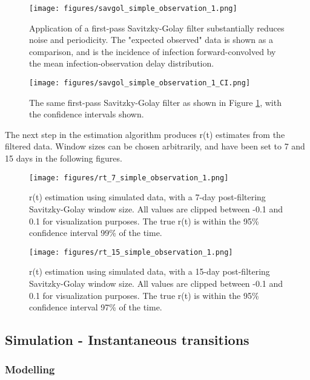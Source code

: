 \documentclass{article}
\begin{document}
{\begin{figure}[h!]
\centering
\texttt{[image: figures/savgol\_simple\_observation\_1.png]}
\caption{Application of a first-pass Savitzky-Golay filter substantially reduces noise and periodicity. The "expected observed" data is shown as a comparison, and is the incidence of infection forward-convolved by the mean infection-observation delay distribution.}
\label{SGnoCI}
\end{figure}

\begin{figure}[h!]
\centering
\texttt{[image: figures/savgol\_simple\_observation\_1\_CI.png]}
\caption{The same first-pass Savitzky-Golay filter as shown in Figure \ref{SGnoCI}, with the confidence intervals shown.} 

\end{figure}

The next step in the estimation algorithm produces r(t) estimates from the filtered data. Window sizes can be chosen arbitrarily, and have been set to 7 and 15 days in the following figures.


\begin{figure}[h!]
\centering
\texttt{[image: figures/rt\_7\_simple\_observation\_1.png]}
\caption{r(t) estimation using simulated data, with a 7-day post-filtering Savitzky-Golay window size. All values are clipped between -0.1 and 0.1 for visualization purposes. The true r(t) is within the 95\% confidence interval 99\% of the time.}
\end{figure}

\clearpage
\begin{figure}[h!]
\centering
\texttt{[image: figures/rt\_15\_simple\_observation\_1.png]}
\caption{r(t) estimation using simulated data, with a 15-day post-filtering Savitzky-Golay window size. All values are clipped between -0.1 and 0.1 for visualization purposes. The true r(t) is within the 95\% confidence interval 97\% of the time.}
\end{figure}



\subsection{Simulation - Instantaneous transitions}
\subsubsection{Modelling}

}
\end{document}
